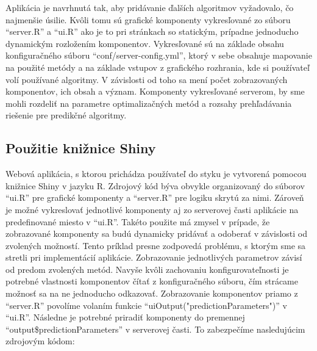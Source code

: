 \documentclass[a4paper,slovak,12pt,appendix]{article}
\begin{document}
Aplikácia je navrhnutá tak, aby pridávanie ďalších algoritmov vyžadovalo, čo
najmenšie úsilie. Kvôli tomu sú grafické komponenty vykresľované zo súboru
``server.R'' a ``ui.R'' ako je to pri stránkach so statickým, prípadne
jednoducho dynamickým rozložením komponentov. Vykresľované sú na základe obsahu
konfiguračného súboru ``conf/server-config.yml'', ktorý v sebe obsahuje
mapovanie na použité metódy a na základe vstupov z grafického rozhrania, kde si
používateľ volí používané algoritmy. V závislosti od toho sa mení počet
zobrazovaných komponentov, ich obsah a význam. Komponenty vykresľované serverom,
by sme mohli rozdeliť na parametre optimalizačných metód a rozsahy
prehľadávania riešenie pre predikčné algoritmy.


\subsection{Použitie knižnice Shiny}
Webová aplikácia, s ktorou prichádza používateľ do styku je vytvorená pomocou
knižnice Shiny v jazyku R. Zdrojový kód býva obvykle organizovaný do súborov
``ui.R'' pre grafické komponenty a ``server.R'' pre logiku skrytú za nimi.
Zároveň je možné vykreslovať jednotlivé komponenty aj zo serverovej časti
aplikácie na predefinované miesto v ``ui.R''. Takéto použite má zmysel
v prípade, že zobrazované komponenty sa budú dynamicky pridávať a odoberať
v závislosti od zvolených možností. Tento príklad presne zodpovedá problému,
s ktorým sme sa stretli pri implementácií aplikácie. Zobrazovanie jednotlivých
parametrov závisí od predom zvolených metód. Navyše kvôli zachovaniu
konfigurovateľnosti je potrebné vlastnosti komponentov čítať z konfiguračného
súboru, čím strácame možnosť sa na ne jednoducho odkazovať. Zobrazovanie
komponentov priamo z ``server.R'' povolíme volaním funkcie
``uiOutput("predictionParameters")'' v ``ui.R''. Následne je potrebné priradiť
komponenty do premennej ``output\$predictionParameters'' v serverovej časti.
To zabezpečíme nasledujúcim zdrojovým kódom:
\end{document}
